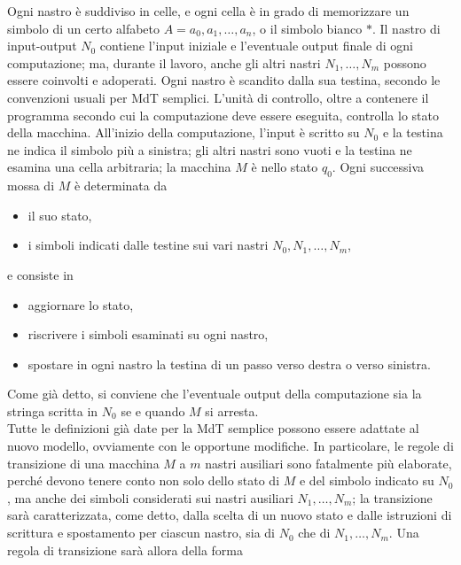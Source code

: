Ogni nastro è suddiviso in celle, e ogni cella è in grado di memorizzare un simbolo
di un certo alfabeto $A = {a_0, a_1, \ldots, a_n}$, o il simbolo bianco $*$. Il
nastro di input-output $N_0$ contiene l'input iniziale e l'eventuale output finale di
ogni computazione; ma, durante il lavoro, anche gli altri nastri $N_1, \ldots, N_m$
possono
essere coinvolti e adoperati. Ogni nastro è scandito dalla sua testina, secondo le
convenzioni usuali per MdT semplici. L'unità di controllo, oltre a contenere il
programma secondo cui la computazione deve essere eseguita, controlla lo stato della
macchina. All'inizio della computazione, l'input è scritto su $N_0$ e la testina ne
indica il simbolo più a sinistra; gli altri nastri sono vuoti e la testina ne esamina
una cella arbitraria; la macchina $M$ è nello stato $q_0$. Ogni successiva mossa di $M$
è determinata da

\begin{itemize}
    \item il suo stato,
    \item i simboli indicati dalle testine sui vari nastri $N_0, N_1, \ldots, N_m$,
\end{itemize}

e consiste in

\begin{itemize}
    \item aggiornare lo stato,
    \item riscrivere i simboli esaminati su ogni nastro,
    \item spostare in ogni nastro la testina di un passo verso destra o verso
          sinistra.
\end{itemize}

Come già detto, si conviene che l'eventuale output della computazione sia la stringa
scritta in $N_0$ se e quando $M$ si arresta.\\
Tutte le definizioni già date per la MdT
semplice possono essere adattate al nuovo modello, ovviamente con le opportune
modifiche. In particolare, le regole di transizione di una macchina $M$ a $m$ nastri
ausiliari sono fatalmente più elaborate, perché devono tenere conto non solo dello
stato di $M$ e del simbolo indicato su $N_0$, ma anche dei simboli considerati sui
nastri ausiliari $N_1, \ldots, N_m$; la transizione sarà caratterizzata, come detto,
dalla scelta di un nuovo stato e dalle istruzioni di scrittura e spostamento per
ciascun nastro, sia di $N_0$ che di $N_1, \ldots, N_m$. Una regola di transizione
sarà allora della forma

